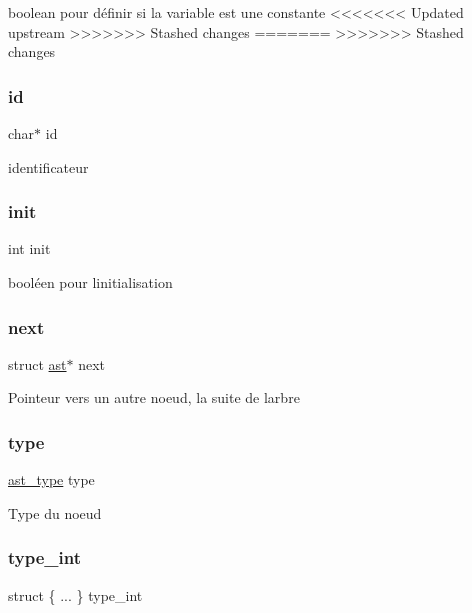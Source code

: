 boolean pour définir si la variable est une constante \mbox{\label{structast_aecb3b0d045ada529257a2fbf8f829599}} 
<<<<<<< Updated upstream
>>>>>>> Stashed changes
=======
>>>>>>> Stashed changes
\subsubsection{\texorpdfstring{id}{id}}
{\footnotesize\ttfamily char$\ast$ id}

identificateur \mbox{\label{structast_a795ea50921b36311ffd5e7baa2ef1f7e}} 
\subsubsection{\texorpdfstring{init}{init}}
{\footnotesize\ttfamily int init}

booléen pour l\textquotesingle{}initialisation \mbox{\label{structast_ae48f04f7acec87ecf7f0bc953cb56bf4}} 
\subsubsection{\texorpdfstring{next}{next}}
{\footnotesize\ttfamily struct \hyperlink{structast}{ast}$\ast$ next}

Pointeur vers un autre noeud, la suite de l\textquotesingle{}arbre \mbox{\label{structast_a8321fc8e556a418583dd74ee9fcc2bf7}} 
\subsubsection{\texorpdfstring{type}{type}}
{\footnotesize\ttfamily \hyperlink{ast_8h_a77091c187ac9a89404fac2e8226daef3}{ast\+\_\+type} type}

Type du noeud \mbox{\label{structast_a48c1fea64ccd73c68d3901c23d65f9f5}} 
\subsubsection{\texorpdfstring{type\+\_\+int}{type\_int}}
{\footnotesize\ttfamily struct \{ ... \}   type\+\_\+int}

